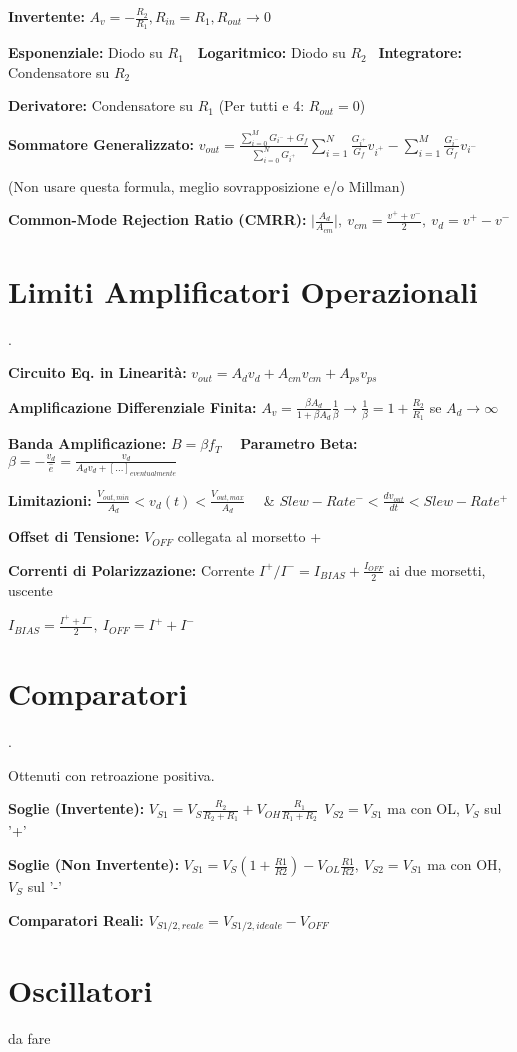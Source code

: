 \documentclass[12pt]{extarticle}
\begin{document}
{\bf Invertente:} $\displaystyle A_v = -\frac{R_2}{R_1}, R_{in} = R_1, R_{out} \to 0$

{\bf Esponenziale:} Diodo su $R_1$\ \ {\bf Logaritmico:} Diodo su $R_2$ \ {\bf Integratore:} Condensatore su $R_2$

{\bf Derivatore:} Condensatore su $R_1$ (Per tutti e 4: $R_{out} = 0$)


{\bf Sommatore Generalizzato:} $\displaystyle v_{out} = \frac{\sum_{i=0}^M G_{i^-} + G_f}{\sum_{i=0}^N G_{i^+}} \sum_{i=1}^N \frac{G_{i^+}}{G_f}v_{i^+}-\sum_{i=1}^M\frac{G_{i^-}}{G_f}v_{i^-}$ 

(Non usare questa formula, meglio sovrapposizione e/o Millman)

{\bf Common-Mode Rejection Ratio (CMRR):} $\displaystyle \bigg |\frac{A_d}{A_{cm}} \bigg |, \ v_{cm} = \frac{v^++v^-}{2}, \ v_d = v^+-v^-$

\section{Limiti Amplificatori Operazionali}.

{\bf Circuito Eq. in Linearità:} $\displaystyle v_{out} = A_dv_d +A_{cm}v_{cm}+A_{ps}v_{ps}$

{\bf Amplificazione Differenziale Finita:} $\displaystyle A_v = \frac{\beta A_d}{1+\beta A_d}\frac{1}{\beta} \to \frac{1}{\beta} = 1+\frac{R_2}{R_1}$ se $A_d \to \infty$

{\bf Banda Amplificazione:} $\displaystyle B = \beta f_T$ \ \ {\bf Parametro Beta:} $\displaystyle \beta = -\frac{v_d}{\hat{e}} = \frac{v_d}{A_dv_d + [...]_{eventualmente}}$

{\bf Limitazioni:} $\displaystyle \frac{V_{out, min}}{A_d} < v_d(t) < \frac{V_{out, max}}{A_d}$ \ \ \&  $\displaystyle Slew-Rate^- < \frac{dv_{out}}{dt} < Slew-Rate^+$

{\bf Offset di Tensione:} $V_{OFF}$ collegata al morsetto +

{\bf Correnti di Polarizzazione:} Corrente $I^+/I^- = I_{BIAS}+\frac{I_{OFF}}{2}$ ai due morsetti, uscente

$\displaystyle I_{BIAS} = \frac{I^++I^-}{2}, \ I_{OFF} = I^++I^-$

\section{Comparatori}.

Ottenuti con retroazione positiva.

{\bf Soglie (Invertente):} $\displaystyle V_{S1} = V_S\frac{R_2}{R_2+R_1}+V_{OH}\frac{R_1}{R_1+R_2} \ \ V_{S2} = V_{S1} $ ma con OL, $V_S$ sul '+'

{\bf Soglie (Non Invertente):} $\displaystyle V_{S1} = V_S(1+\frac{R1}{R2}) - V_{OL}\frac{R1}{R2}, \ V_{S2} = V_{S1}$ ma con OH, $V_S$ sul '-'

{\bf Comparatori Reali:} $\displaystyle V_{S1/2, reale} = V_{S1/2, ideale}-V_{OFF}$

\section{Oscillatori}

da fare
\end{document}
